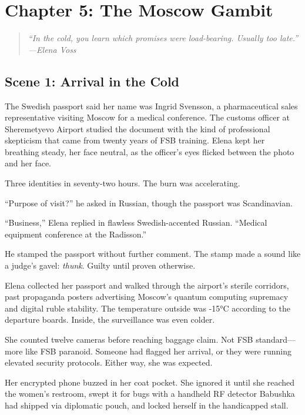 \hypertarget{chapter-5-the-moscow-gambit}{%
\section{Chapter 5: The Moscow Gambit}\label{chapter-5-the-moscow-gambit}}

\begin{quote}
\itshape ``In the cold, you learn which promises were load-bearing. Usually too
late.''\\
\normalfont\hfill---Elena Voss
\end{quote}

\hypertarget{scene-1-arrival-in-the-cold}{%
\subsection{Scene 1: Arrival in the Cold}\label{scene-1-arrival-in-the-cold}}

The Swedish passport said her name was Ingrid Svensson, a pharmaceutical sales representative visiting Moscow for a medical conference. The customs officer at Sheremetyevo Airport studied the document with the kind of professional skepticism that came from twenty years of FSB training. Elena kept her breathing steady, her face neutral, as the officer's eyes flicked between the photo and her face.

Three identities in seventy-two hours. The burn was accelerating.

``Purpose of visit?'' he asked in Russian, though the passport was Scandinavian.

``Business,'' Elena replied in flawless Swedish-accented Russian. ``Medical equipment conference at the Radisson.''

He stamped the passport without further comment. The stamp made a sound like a judge's gavel: \emph{thunk}. Guilty until proven otherwise.

Elena collected her passport and walked through the airport's sterile corridors, past propaganda posters advertising Moscow's quantum computing supremacy and digital ruble stability. The temperature outside was -15°C according to the departure boards. Inside, the surveillance was even colder.

She counted twelve cameras before reaching baggage claim. Not FSB standard---more like FSB paranoid. Someone had flagged her arrival, or they were running elevated security protocols. Either way, she was expected.

Her encrypted phone buzzed in her coat pocket. She ignored it until she reached the women's restroom, swept it for bugs with a handheld RF detector Babushka had shipped via diplomatic pouch, and locked herself in the handicapped stall.

